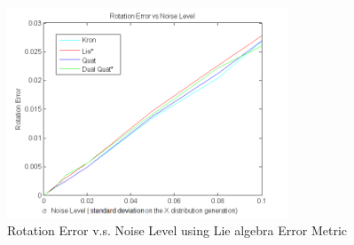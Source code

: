 \documentclass[twocolumn,10pt]{asme2ej}
\begin{document}
\begin{figure}[h]
\includegraphics[width=3.3in]{figure/rotErrorRand}
\centering
\caption{Rotation Error v.s. Noise Level using Lie algebra Error Metric }
\label{roterror}
\end{figure}
\end{document}
